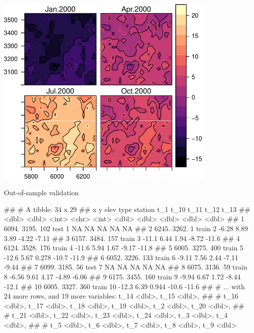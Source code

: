 \documentclass[11pt,ignorenonframetext,]{beamer}
\let\oldverbatim\verbatim
\let\endoldverbatim\endverbatim
\renewenvironment{verbatim}{\footnotesize\begin{spacing}{0.9}\oldverbatim}{\endoldverbatim\end{spacing}}
\begin{document}
\begin{frame}{}
\protect\hypertarget{section-3}{}

\begin{center}\includegraphics[width=0.8\textwidth]{Lec22_files/figure-beamer/unnamed-chunk-17-1} \end{center}

\end{frame}

\begin{frame}[fragile]{Out-of-sample validation}
\protect\hypertarget{out-of-sample-validation}{}

\begin{verbatim}
## # A tibble: 34 x 29
##        x     y  elev type  station    t_1  t_10   t_11   t_12   t_13
##    <dbl> <dbl> <int> <chr>   <int>  <dbl> <dbl>  <dbl>  <dbl>  <dbl>
##  1 6094. 3195.   102 test        1  NA    NA    NA      NA     NA   
##  2 6245. 3262.     1 train       2  -6.28  8.89  3.89   -4.22  -7.11
##  3 6157. 3484.   157 train       3 -11.1   6.44  1.94   -8.72 -11.6 
##  4 6124. 3528.   176 train       4 -11.6   5.94  1.67   -9.17 -11.8 
##  5 6005. 3275.   400 train       5 -12.6   5.67  0.278 -10.7  -11.9 
##  6 6052. 3226.   133 train       6  -9.11  7.56  2.44   -7.11  -9.44
##  7 6099. 3185.    56 test        7  NA    NA    NA      NA     NA   
##  8 6075. 3136.    59 train       8  -6.56  9.61  4.17   -4.89  -6.06
##  9 6175. 3455.   160 train       9  -9.94  6.67  1.72   -8.44 -12.1 
## 10 6005. 3327.   360 train      10 -12.3   6.39  0.944 -10.6  -11.6 
## # ... with 24 more rows, and 19 more variables: t_14 <dbl>, t_15 <dbl>,
## #   t_16 <dbl>, t_17 <dbl>, t_18 <dbl>, t_19 <dbl>, t_2 <dbl>, t_20 <dbl>,
## #   t_21 <dbl>, t_22 <dbl>, t_23 <dbl>, t_24 <dbl>, t_3 <dbl>, t_4 <dbl>,
## #   t_5 <dbl>, t_6 <dbl>, t_7 <dbl>, t_8 <dbl>, t_9 <dbl>
\end{verbatim}

\end{frame}
\end{document}
